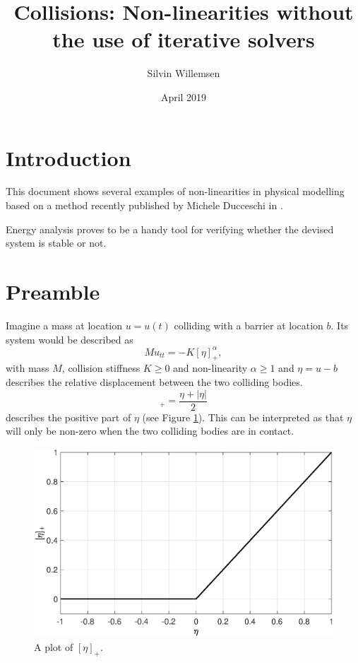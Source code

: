 \documentclass{article}
\title{Collisions: Non-linearities without the use of iterative solvers}
\author{Silvin Willemsen}
\date{April 2019}
\begin{document}
\ifpdf %
\else  %
\fi

\maketitle

\section{Introduction}
This document shows several examples of non-linearities in physical modelling based on a method recently published by Michele Ducceschi in \cite{Ducceschi2019}.

Energy analysis proves to be a handy tool for verifying whether the devised system is stable or not.

\section{Preamble}
Imagine a mass at location $u = u(t)$ colliding with a barrier at location $b$. Its system would be described as
\begin{equation}\label{eq:massBarrier}
    Mu_{tt} = -K[\eta]_+^\alpha,
\end{equation}
with mass $M$, collision stiffness $K \geq 0$ and non-linearity $\alpha \geq 1$ and $\eta = u - b$ describes the relative displacement between the two colliding bodies.
\begin{equation}
    [\eta]_+ = \frac{\eta + |\eta|}{2}
\end{equation}
describes the positive part of $\eta$ (see Figure \ref{fig:eta}). This can be interpreted as that $\eta$ will only be non-zero when the two colliding bodies are in contact.

\begin{figure}[h]
\centerline{\includegraphics[width=0.6\columnwidth]{eta.eps}}
\caption{\label{fig:eta}{A plot of $[\eta]_+$.}}
\end{figure}
\end{document}
